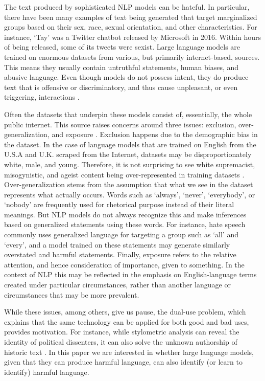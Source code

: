 \documentclass{bmcart}
\begin{document}
The text produced by sophisticated NLP models can be hateful. In particular, there have been many examples of text being generated that target marginalized groups based on their sex, race, sexual orientation, and other characteristics. For instance, `Tay' was a Twitter chatbot released by Microsoft in 2016. Within hours of being released, some of its tweets were sexist. Large language models are trained on enormous datasets from various, but primarily internet-based, sources. This means they usually contain untruthful statements, human biases, and abusive language. Even though models do not possess intent, they do produce text that is offensive or discriminatory, and thus cause unpleasant, or even triggering, interactions \cite{bender2021dangers}.

Often the datasets that underpin these models consist of, essentially, the whole public internet. This source raises concerns around three issues: exclusion, over-generalization, and exposure \cite{hovy2016social}. Exclusion happens due to the demographic bias in the dataset. In the case of language models that are trained on English from the U.S.A and U.K. scraped from the Internet, datasets may be disproportionately white, male, and young. Therefore, it is not surprising to see white supremacist, misogynistic, and ageist content being over-represented in training datasets \cite{bender2021dangers}. Over-generalization stems from the assumption that what we see in the dataset represents what actually occurs. Words such as `always', `never', `everybody', or `nobody' are frequently used for rhetorical purpose instead of their literal meanings. But NLP models do not always recognize this and make inferences based on generalized statements using these words. For instance, hate speech commonly uses generalized language for targeting a group such as `all' and `every', and a model trained on these statements may generate similarly overstated and harmful statements. Finally, exposure refers to the relative attention, and hence consideration of importance, given to something. In the context of NLP this may be reflected in the emphasis on English-language terms created under particular circumstances, rather than another language or circumstances that may be more prevalent.

While these issues, among others, give us pause, the dual-use problem, which explains that the same technology can be applied for both good and bad uses, provides motivation. For instance, while stylometric analysis can reveal the identity of political dissenters, it can also solve the unknown authorship of historic text \cite{hovy2016social}. In this paper we are interested in whether large language models, given that they can produce harmful language, can also identify (or learn to identify) harmful language.
\end{document}
